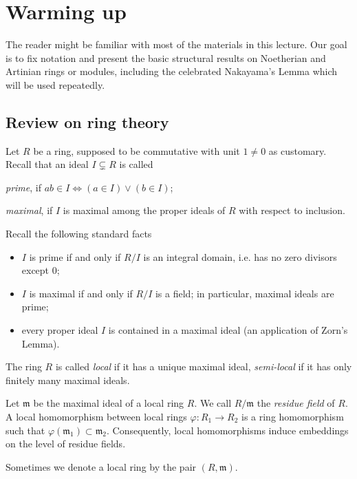 
\chapter{Warming up}

The reader might be familiar with most of the materials in this lecture. Our goal is to fix notation and present the basic structural results on Noetherian and Artinian rings or modules, including the celebrated Nakayama's Lemma which will be used repeatedly.

\section{Review on ring theory}
Let $R$ be a ring, supposed to be commutative with unit $1 \neq 0$ as customary. Recall that an ideal $I \subsetneq R$ is called
\begin{compactitem}
	\item \emph{prime}, if $ab \in I \iff (a \in I) \vee (b \in I)$;
	\item \emph{maximal}, if $I$ is maximal among the proper ideals of $R$ with respect to inclusion.
\end{compactitem}
Recall the following standard facts
\begin{itemize}
	\item $I$ is prime if and only if $R/I$ is an integral domain, i.e. has no zero divisors except $0$;
	\item $I$ is maximal if and only if $R/I$ is a field; in particular, maximal ideals are prime;
	\item every proper ideal $I$ is contained in a maximal ideal (an application of Zorn's Lemma).
\end{itemize}

\begin{definition} 
	The ring $R$ is called \emph{local} if it has a unique maximal ideal, \emph{semi-local} if it has only finitely many maximal ideals.
	
	Let $\mathfrak{m}$ be the maximal ideal of a local ring $R$. We call $R/\mathfrak{m}$ the \emph{residue field} of $R$. A local homomorphism between local rings $\varphi: R_1 \to R_2$ is a ring homomorphism such that $\varphi(\mathfrak{m}_1) \subset \mathfrak{m}_2$. Consequently, local homomorphisms induce embeddings on the level of residue fields.
\end{definition}
Sometimes we denote a local ring by the pair $(R, \mathfrak{m})$.

